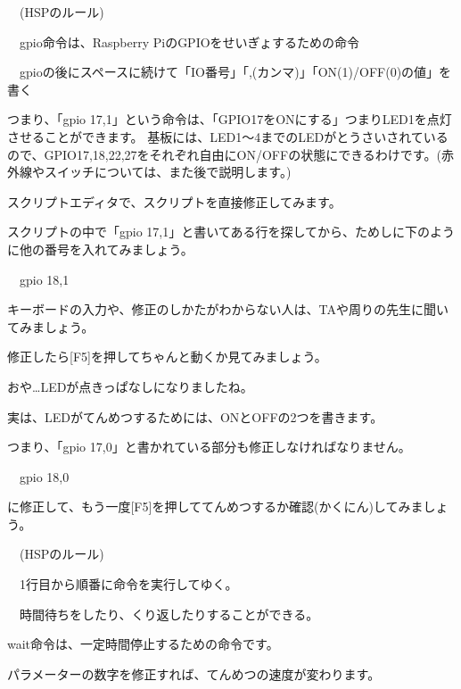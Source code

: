 \documentclass[a4paper,12pt]{jarticle}
\begin{document}
\bigskip

\ \ (HSPのルール)


\bigskip

\ \ gpio命令は、Raspberry PiのGPIOをせいぎょするための命令

\ \ gpioの後にスペースに続けて「IO番号」「,(カンマ)」「ON(1)/OFF(0)の値」を書く


\bigskip

\bigskip

つまり、「gpio 17,1」という命令は、「GPIO17をONにする」つまりLED1を点灯させることができます。
基板には、LED1〜4までのLEDがとうさいされているので、GPIO17,18,22,27をそれぞれ自由にON/OFFの状態にできるわけです。(赤外線やスイッチについては、また後で説明します。)


\bigskip

スクリプトエディタで、スクリプトを直接修正してみます。

スクリプトの中で「gpio 17,1」と書いてある行を探してから、ためしに下のように他の番号を入れてみましょう。


\bigskip

\ \ gpio 18,1


\bigskip


\bigskip

キーボードの入力や、修正のしかたがわからない人は、TAや周りの先生に聞いてみましょう。


\bigskip

修正したら[F5]を押してちゃんと動くか見てみましょう。

おや…LEDが点きっぱなしになりましたね。

実は、LEDがてんめつするためには、ONとOFFの2つを書きます。

つまり、「gpio 17,0」と書かれている部分も修正しなければなりません。


\bigskip

\ \ gpio 18,0


\bigskip

に修正して、もう一度[F5]を押しててんめつするか確認(かくにん)してみましょう。


\bigskip

\ \ (HSPのルール)


\bigskip

\ \ 1行目から順番に命令を実行してゆく。

\ \ 時間待ちをしたり、くり返したりすることができる。


\bigskip

wait命令は、一定時間停止するための命令です。

パラメーターの数字を修正すれば、てんめつの速度が変わります。
\end{document}
